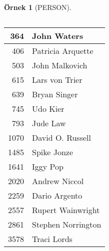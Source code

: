 \documentclass[dvipsnames]{beamer}
\theoremstyle{definition}
\theoremstyle{example}
\newtheorem{ornek}[theorem]{Örnek}
\theoremstyle{plain}
\begin{document}
\begin{frame}
\begin{ornek}[PERSON]
\begin{columns}[b]
      \begin{tiny}
      \begin{table}
        \begin{tabular}{|r|l|}\hline
 364 & John Waters          \\\hline
 406 & Patricia Arquette    \\\hline
 503 & John Malkovich       \\\hline
 615 & Lars von Trier       \\\hline
 639 & Bryan Singer         \\\hline
 745 & Udo Kier             \\\hline
 793 & Jude Law             \\\hline
1070 & David O. Russell     \\\hline
1485 & Spike Jonze          \\\hline
1641 & Iggy Pop             \\\hline
2020 & Andrew Niccol        \\\hline
2259 & Dario Argento        \\\hline
2557 & Rupert Wainwright    \\\hline
2861 & Stephen Norrington   \\\hline
3578 & Traci Lords          \\\hline
        \end{tabular}
      \end{table}
      \end{tiny}
  \end{columns}
  \end{ornek}
\end{frame}
\end{document}
